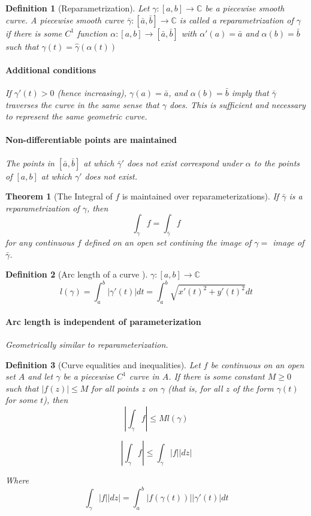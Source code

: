 \documentclass[a4paper]{article}
\newtheorem{definition}{Definition}
\newtheorem{theorem}{Theorem}
\newcommand{\C}{\mathbb{C}}
\begin{document}
\begin{definition}[Reparametrization]
  Let $\gamma : [a, b] \to \C$ be a piecewise smooth curve.
  A  piecewise smooth curve $\bar{\gamma}: [\bar{a}, \bar{b}] \to \C$ is called a reparametrization of $\gamma$ if there is some $C^1$ function $\alpha: [a, b] \to [\bar{a}, \bar{b}]$ with $\alpha'(a) = \bar{a}$ and $\alpha(b) = \bar{b}$ such that $\gamma(t) = \hat{\gamma}(\alpha(t))$
  \paragraph{Additional conditions}
  If $\gamma'(t) > 0 $ (hence increasing), $\gamma(a) = \bar{a}$, and $\alpha(b) = \bar{b}$ imply that $\bar{\gamma}$
  traverses the curve in the same sense that $\gamma$ does. This is sufficient and necessary to represent the same geometric curve.

  \paragraph{Non-differentiable points are maintained}
  The points in $[\bar{a}, \bar{b}]$ at which $\bar{\gamma}'$ does not exist correspond under $\alpha$ to the points of $[a, b]$ at which $\gamma'$ does not exist.
\end{definition}

\begin{theorem}[The Integral of $f$ is maintained over reparameterizations]
  If $\bar{\gamma}$  is a reparametrization  of $\gamma$, then 
  \[
    \int_\gamma f = \int_{\bar{\gamma}} f
  \]
  for any continuous $f$ defined on an open set contining the image of $\gamma = $ image of $\bar{\gamma}$.
\end{theorem}

\begin{definition}[Arc length of a curve ]
  \(\gamma : [a, b] \to \C\)
  \[
    l(\gamma) = \int_a^b|\gamma'(t)| dt = \int^b_a \sqrt{x'(t)^2 + y'(t)^2}dt
  \]

  \paragraph{Arc length is independent of parameterization}
  Geometrically similar to reparameterization. 

\end{definition}


\begin{definition}[Curve equalities and inequalities]
  Let $f$ be continuous on an open set $A$ and let $\gamma$ be a piecewise $C^1$ curve in $A$. If there is some constant $M \geq 0$ such that $|f(z)| \leq M$ for all points $z$ on $\gamma$ (that is, for all $z$ of the form $\gamma(t)$ for some $t$), then
  \[
    |\int_\gamma f| \leq M l(\gamma)
  \]

  \[
    |\int_\gamma f| \leq \int_\gamma |f| |dz|
  \]

  Where
  \[
    \int_\gamma |f| |dz| = \int_a^b |f(\gamma(t))|| \gamma'(t)| dt
  \]
\end{definition}
\end{document}
